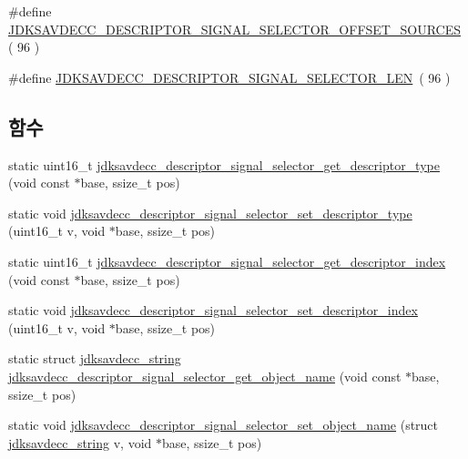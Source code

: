 \begin{DoxyCompactItemize}
\item 
\#define \hyperlink{group__descriptor__signal__selector_ga9c85bcd752c729bc6b7b3239b92baa3a}{J\+D\+K\+S\+A\+V\+D\+E\+C\+C\+\_\+\+D\+E\+S\+C\+R\+I\+P\+T\+O\+R\+\_\+\+S\+I\+G\+N\+A\+L\+\_\+\+S\+E\+L\+E\+C\+T\+O\+R\+\_\+\+O\+F\+F\+S\+E\+T\+\_\+\+S\+O\+U\+R\+C\+ES}~( 96 )
\item 
\#define \hyperlink{group__descriptor__signal__selector_gac2216dd9d51df77aa73eb7459e73022c}{J\+D\+K\+S\+A\+V\+D\+E\+C\+C\+\_\+\+D\+E\+S\+C\+R\+I\+P\+T\+O\+R\+\_\+\+S\+I\+G\+N\+A\+L\+\_\+\+S\+E\+L\+E\+C\+T\+O\+R\+\_\+\+L\+EN}~( 96 )
\end{DoxyCompactItemize}
\subsection*{함수}
\begin{DoxyCompactItemize}
\item 
static uint16\+\_\+t \hyperlink{group__descriptor__signal__selector_gaeb5dced295d94393a270851da64bf3f7}{jdksavdecc\+\_\+descriptor\+\_\+signal\+\_\+selector\+\_\+get\+\_\+descriptor\+\_\+type} (void const $\ast$base, ssize\+\_\+t pos)
\item 
static void \hyperlink{group__descriptor__signal__selector_ga6f01d6d942f5c1bfa6779727180b2c4b}{jdksavdecc\+\_\+descriptor\+\_\+signal\+\_\+selector\+\_\+set\+\_\+descriptor\+\_\+type} (uint16\+\_\+t v, void $\ast$base, ssize\+\_\+t pos)
\item 
static uint16\+\_\+t \hyperlink{group__descriptor__signal__selector_gaeb9aa2314f6aaf7049efcf52849c0a9f}{jdksavdecc\+\_\+descriptor\+\_\+signal\+\_\+selector\+\_\+get\+\_\+descriptor\+\_\+index} (void const $\ast$base, ssize\+\_\+t pos)
\item 
static void \hyperlink{group__descriptor__signal__selector_ga5d26f0d837682a4616604f6947c17347}{jdksavdecc\+\_\+descriptor\+\_\+signal\+\_\+selector\+\_\+set\+\_\+descriptor\+\_\+index} (uint16\+\_\+t v, void $\ast$base, ssize\+\_\+t pos)
\item 
static struct \hyperlink{structjdksavdecc__string}{jdksavdecc\+\_\+string} \hyperlink{group__descriptor__signal__selector_ga01445c4bc3aea886702910ab8483ad13}{jdksavdecc\+\_\+descriptor\+\_\+signal\+\_\+selector\+\_\+get\+\_\+object\+\_\+name} (void const $\ast$base, ssize\+\_\+t pos)
\item 
static void \hyperlink{group__descriptor__signal__selector_ga58c520bfbc21f4e547c8495af1ef4e07}{jdksavdecc\+\_\+descriptor\+\_\+signal\+\_\+selector\+\_\+set\+\_\+object\+\_\+name} (struct \hyperlink{structjdksavdecc__string}{jdksavdecc\+\_\+string} v, void $\ast$base, ssize\+\_\+t pos)

\end{DoxyCompactItemize}
